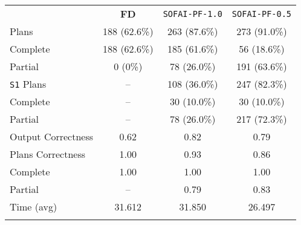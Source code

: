 \documentclass[12pt,a4paper]{standalone}
\begin{document}
	\begin{tabular}{||l|c|c|c||}
	\hhline{~|t:===:t|}
	\multicolumn{1}{c||}{} & \multicolumn{1}{c|}{\textbf{FD}} 	& \texttt{SOFAI-PF-1.0}  &\texttt{SOFAI-PF-0.5} \\
	\hhline{|t:=:b:===:|}
	Plans   					& 188 (62.6\%)					&263 (87.6\%) & 273 (91.0\%)\\
	\hhline{||----||}
	\quad Complete 			& 188 (62.6\%)					&185 (61.6\%) & 56 (18.6\%)\\
	\quad Partial			& 0   (0\%)						&78  (26.0\%) & 191 (63.6\%)\\
	\hhline{|:====:|}
	\texttt{S1} Plans   	& --     						&108 (36.0\%) & 247 (82.3\%) \\
	\hhline{||----||}
	\quad Complete			& --      						&30 (10.0\%) & 30 (10.0\%)\\
	\quad Partial			& --      						&78 (26.0\%) & 217 (72.3\%)\\
	\hhline{|:====:|}
	Output Correctness  		& 0.62     						&0.82 & 0.79\\
	\hhline{||----||}
	Plans Correctness  			& 1.00      					&0.93 & 0.86\\
	\hhline{||----||}
	\quad Complete     	& 1.00					&1.00 & 1.00\\
	\quad Partial    	& --					&0.79 & 0.83 \\
	\hhline{|:====:|}
	Time (avg)  								& 31.612 						&31.850 & 26.497\\
	\hhline{|b:====:b|}
\end{tabular}
\end{document}
